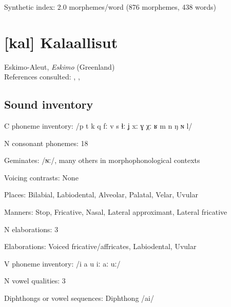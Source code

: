 {\begin{appendixdesc}
\item[Synthetic index:] 2.0 morphemes/word (876 morphemes, 438 words)
\end{appendixdesc}
\section*{[kal] Kalaallisut}  %
Eskimo-Aleut, \textit{Eskimo} (Greenland)\medskip\\
References consulted: \citet{Fortescue1984}, \citet{Hagerup2011}, \citet{Jacobsen2000}

\subsection*{Sound inventory}
\begin{appendixdesc}

\item[C phoneme inventory:] /p t k q fː v s ɬː ʝ xː ɣ χː ʁ m n ŋ ɴ l/

\item[N consonant phonemes:] 18

\item[Geminates:] /ɴː/, many others in morphophonological contexts

\item[Voicing contrasts:] None

\item[Places:] Bilabial, Labiodental, Alveolar, Palatal, Velar, Uvular

\item[Manners:] Stop, Fricative, Nasal, Lateral approximant, Lateral fricative 

\item[N elaborations:] 3

\item[Elaborations:] Voiced fricative/affricates, Labiodental, Uvular

\item[V phoneme inventory:] /i a u iː aː uː/

\item[N vowel qualities:] 3

\item[Diphthongs or vowel sequences:] Diphthong /ai/


\end{appendixdesc}}
